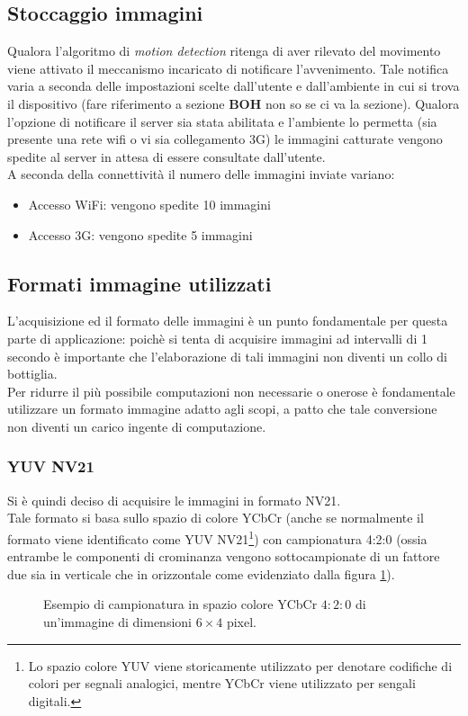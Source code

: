 \subsection{Stoccaggio immagini}
Qualora l'algoritmo di \textit{motion detection} ritenga di aver rilevato del movimento viene attivato il meccanismo incaricato di notificare l'avvenimento. Tale notifica varia a seconda delle impostazioni scelte dall'utente e dall'ambiente in cui si trova il dispositivo (fare riferimento a sezione \textbf{BOH} non so se ci va la sezione). Qualora l'opzione di notificare il server sia stata abilitata e l'ambiente lo permetta (sia presente una rete wifi o vi sia collegamento 3G) le immagini catturate vengono spedite al server in attesa di essere consultate dall'utente.\\
A seconda della connettività il numero delle immagini inviate variano:
\begin{itemize}
  \item Accesso WiFi: vengono spedite 10 immagini
  \item Accesso 3G: vengono spedite 5 immagini
\end{itemize}

\subsection{Formati immagine utilizzati}
L'acquisizione ed il formato delle immagini è un punto fondamentale per questa parte di applicazione: poichè si tenta di acquisire immagini ad intervalli di 1 secondo è importante che l'elaborazione di tali immagini non diventi un collo di bottiglia.\\

Per ridurre il più possibile computazioni non necessarie o onerose è fondamentale utilizzare un formato immagine adatto agli scopi, a patto che tale conversione non diventi un carico ingente di computazione.\\

\subsubsection{YUV NV21}
Si è quindi deciso di acquisire le immagini in formato NV21.\\
Tale formato si basa sullo spazio di colore YCbCr (anche se normalmente il formato viene identificato come YUV NV21\footnote{ Lo spazio colore YUV viene storicamente utilizzato per denotare codifiche di colori per segnali analogici, mentre YCbCr viene utilizzato per sengali digitali.}) con campionatura 4:2:0 (ossia entrambe le componenti di crominanza vengono sottocampionate di un fattore due sia in verticale che in orizzontale come evidenziato dalla figura \ref{YUVsampling}).\\
\begin{figure}[!ht]
\begin{center}
\YUVsampling
\end{center}
\caption{Esempio di campionatura in spazio colore YCbCr $4:2:0$ di un'immagine di dimensioni $6×4$ pixel.}
\label{YUVsampling}
\end{figure}


